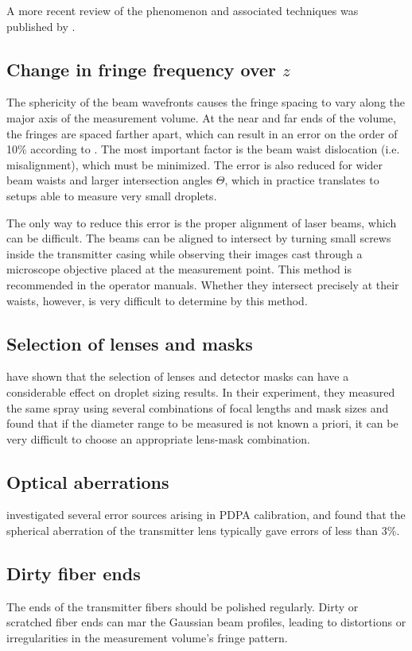 \documentclass[11.5pt,oneside]{book}
\begin{document}
A more recent review of the phenomenon and associated techniques was published by
\citet{Strakey00, Strakey00a}.

\subsection{Change in fringe frequency over $z$}
The sphericity of the beam wavefronts causes the fringe spacing to vary along
the major axis of the measurement volume. At the near and far ends of the
volume, the fringes are spaced farther apart, which can result in an error on
the order of 10\% according to \citet{Albrecht03}. The most important factor is
the beam waist dislocation (i.e. misalignment), which must be minimized. The
error is also reduced for wider beam waists and larger intersection angles
$\Theta$, which in practice translates to setups able to measure very small
droplets.

The only way to reduce this error is the proper alignment of laser
beams, which can be difficult. The beams can be aligned to intersect by turning
small screws inside the transmitter casing while observing their images cast
through a microscope objective placed at the measurement point. This method is
recommended in the operator manuals. Whether they intersect precisely at their waists, however, is very
difficult to determine by this method.

\subsection{Selection of lenses and masks}
\citet{Davis04} have shown that the selection of lenses and detector masks
can have a considerable effect on droplet sizing results. In their experiment,
they measured the same spray using several combinations of focal lengths and mask
sizes and found that if the diameter range to be measured is not known a priori,
it can be very difficult to choose an appropriate lens-mask combination.

\subsection{Optical aberrations}
\citet{Dressler90} investigated several error sources arising in PDPA
calibration, and found that the spherical aberration of the transmitter lens
typically gave errors of less than 3\%.

\subsection{Dirty fiber ends}
The ends of the transmitter fibers should be polished regularly. Dirty or
scratched fiber ends can mar the Gaussian beam profiles, leading to distortions
or irregularities in the measurement volume's fringe pattern.
\end{document}
